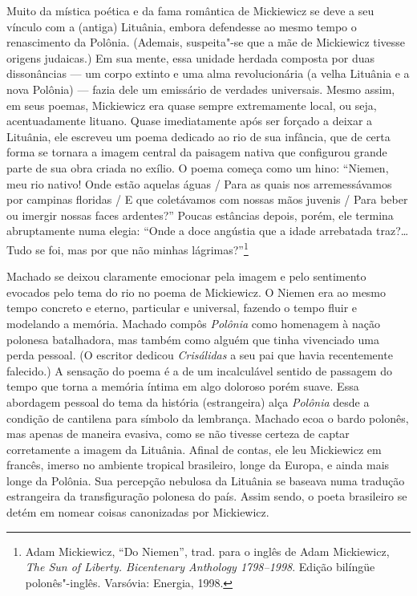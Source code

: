 Muito da mística poética e da fama romântica de Mickiewicz se deve a seu
vínculo com a (antiga) Lituânia, embora defendesse ao mesmo tempo o
renascimento da Polônia. (Ademais, suspeita"-se que a mãe de Mickiewicz
tivesse origens judaicas.) Em sua mente, essa unidade herdada composta
por duas dissonâncias --- um corpo extinto e uma alma revolucionária (a
velha Lituânia e a nova Polônia) --- fazia dele um emissário de verdades
universais. Mesmo assim, em seus poemas, Mickiewicz era quase sempre
extremamente local, ou seja, acentuadamente lituano. Quase imediatamente
após ser forçado a deixar a Lituânia, ele escreveu um poema dedicado ao
rio de sua infância, que de certa forma se tornara a imagem central da
paisagem nativa que configurou grande parte de sua obra criada no
exílio. O poema começa como um hino: ``Niemen, meu rio nativo! Onde
estão aquelas águas / Para as quais nos arremessávamos por campinas
floridas / E que coletávamos com nossas mãos juvenis / Para beber ou
imergir nossas faces ardentes?'' Poucas estâncias depois, porém, ele
termina abruptamente numa elegia: ``Onde a doce angústia que a idade
arrebatada traz?\ldots{} Tudo se foi, mas por que não minhas
lágrimas?''\footnote{Adam Mickiewicz, ``Do Niemen'', trad. para o
  inglês de Adam Mickiewicz, \textit{The Sun of Liberty. Bicentenary
  Anthology 1798--1998}. Edição bilíngüe polonês"-inglês. Varsóvia:
  Energia, 1998.}

Machado se deixou claramente emocionar pela imagem e pelo sentimento
evocados pelo tema do rio no poema de Mickiewicz. O Niemen era ao mesmo
tempo concreto e eterno, particular e universal, fazendo o tempo fluir e
modelando a memória. Machado compôs \textit{Polônia} como homenagem à
nação polonesa batalhadora, mas também como alguém que tinha vivenciado
uma perda pessoal. (O escritor dedicou \textit{Crisálidas} a seu pai que
havia recentemente falecido.) A sensação do poema é a de um incalculável
sentido de passagem do tempo que torna a memória íntima em algo doloroso
porém suave. Essa abordagem pessoal do tema da história (estrangeira)
alça \textit{Polônia} desde a condição de cantilena para símbolo da
lembrança. Machado ecoa o bardo polonês, mas apenas de maneira evasiva,
como se não tivesse certeza de captar corretamente a imagem da Lituânia.
Afinal de contas, ele leu Mickiewicz em francês, imerso no ambiente
tropical brasileiro, longe da Europa, e ainda mais longe da Polônia. Sua
percepção nebulosa da Lituânia se baseava numa tradução estrangeira da
transfiguração polonesa do país. Assim sendo, o poeta brasileiro se
detém em nomear coisas canonizadas por Mickiewicz.

